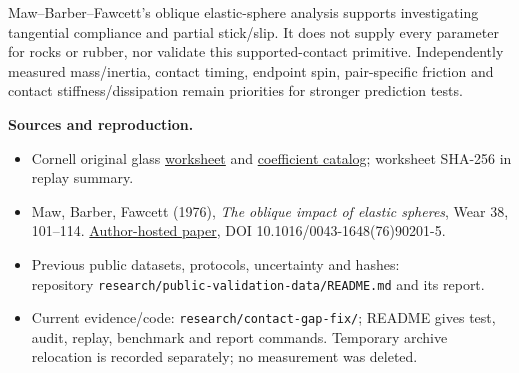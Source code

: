 \documentclass[10pt,a4paper]{article}
\begin{document}
Maw--Barber--Fawcett's oblique elastic-sphere analysis supports investigating
tangential compliance and partial stick/slip. It does not supply every parameter
for rocks or rubber, nor validate this supported-contact primitive. Independently
measured mass/inertia, contact timing, endpoint spin, pair-specific friction and
contact stiffness/dissipation remain priorities for stronger prediction tests.

\textbf{Sources and reproduction.}
\begin{itemize}
\item Cornell original glass \href{https://grainflowresearch.mae.cornell.edu/impact/data/Results-3mmglass-binary}{worksheet} and \href{https://grainflowresearch.mae.cornell.edu/impact/data/Impact%20Results.html}{coefficient catalog}; worksheet SHA-256 in replay summary.
\item Maw, Barber, Fawcett (1976), \emph{The oblique impact of elastic spheres}, Wear 38, 101--114. \href{https://websites.umich.edu/~jbarber/Wear1976.pdf}{Author-hosted paper}, DOI 10.1016/0043-1648(76)90201-5.
\item Previous public datasets, protocols, uncertainty and hashes:\\repository \texttt{research/public-validation-data/README.md} and its report.
\item Current evidence/code: \texttt{research/contact-gap-fix/}; README gives test, audit, replay, benchmark and report commands. Temporary archive relocation is recorded separately; no measurement was deleted.
\end{itemize}
\end{document}
